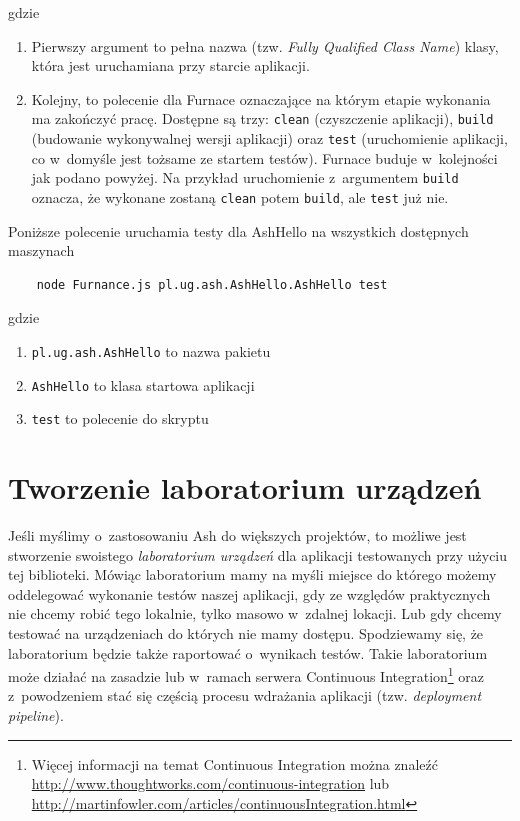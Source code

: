 \documentclass[brudnopis]{xmgr}
\begin{document}
gdzie

\begin{enumerate}
  \item Pierwszy argument to pełna nazwa (tzw. \textit{Fully Qualified Class Name}) klasy, która jest uruchamiana przy starcie aplikacji. 
  \item Kolejny, to polecenie dla Furnace oznaczające na którym etapie wykonania ma zakończyć pracę. Dostępne są trzy: \texttt{clean} (czyszczenie aplikacji), \texttt{build} (budowanie wykonywalnej wersji aplikacji) oraz \texttt{test} (uruchomienie aplikacji, co w~domyśle jest tożsame ze startem testów). Furnace buduje w~kolejności jak podano powyżej. Na przykład uruchomienie z~argumentem \texttt{build} oznacza, że wykonane zostaną \texttt{clean} potem \texttt{build}, ale \texttt{test} już nie.
\end{enumerate}

Poniższe polecenie uruchamia testy dla AshHello na wszystkich dostępnych maszynach 

\begin{lstlisting}
	node Furnance.js pl.ug.ash.AshHello.AshHello test
\end{lstlisting}

gdzie

\begin{enumerate}
  \item \texttt{pl.ug.ash.AshHello} to nazwa pakietu
  \item \texttt{AshHello} to klasa startowa aplikacji
  \item \texttt{test} to polecenie do skryptu 
\end{enumerate}

\section{Tworzenie laboratorium urządzeń}

Jeśli myślimy o~zastosowaniu Ash do większych projektów, to możliwe jest stworzenie swoistego \textit{laboratorium urządzeń} dla aplikacji testowanych przy użyciu tej biblioteki. Mówiąc laboratorium mamy na myśli miejsce do którego możemy oddelegować wykonanie testów naszej aplikacji, gdy ze względów praktycznych nie chcemy robić tego lokalnie, tylko masowo w~zdalnej lokacji. Lub gdy chcemy testować na urządzeniach do których nie mamy dostępu. Spodziewamy się, że laboratorium będzie także raportować o~wynikach testów. Takie laboratorium może działać na zasadzie lub w~ramach serwera Continuous Integration\footnote{ Więcej informacji na temat Continuous Integration można znaleźć \url{http://www.thoughtworks.com/continuous-integration} lub \url{http://martinfowler.com/articles/continuousIntegration.html} } oraz z~powodzeniem stać się częścią procesu wdrażania aplikacji (tzw. \textit{deployment pipeline}).
\end{document}
